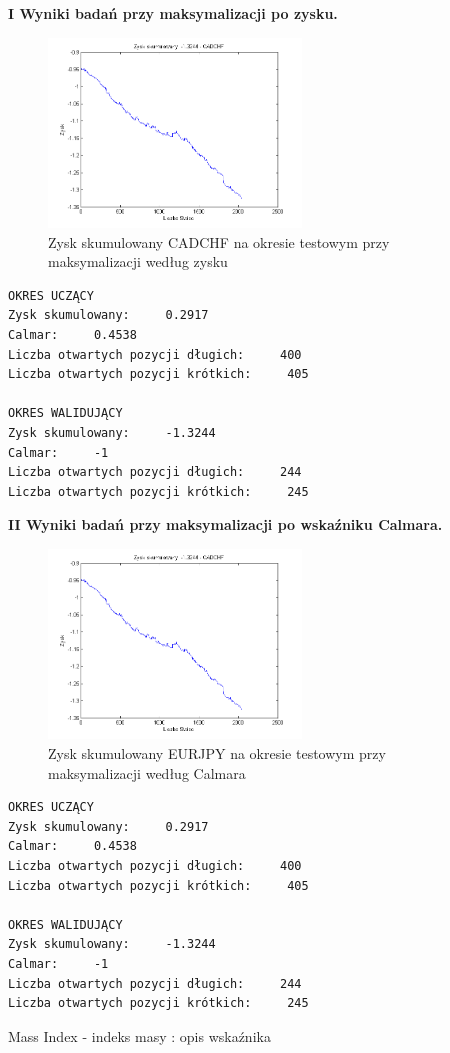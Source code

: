 \documentclass[12pt,a4paper]{article}
\begin{document}
\noindent \textbf{I Wyniki badań przy maksymalizacji po zysku.}\\
\begin{figure}[h!]
\centering
\includegraphics[width = 0.6\textwidth]{SS_CADCHF_S4LS_zysk.png}
\caption{Zysk skumulowany CADCHF na okresie testowym przy maksymalizacji według zysku}
\end{figure}
\FloatBarrier
\begin{verbatim}
OKRES UCZĄCY
Zysk skumulowany:     0.2917
Calmar:     0.4538
Liczba otwartych pozycji długich:     400
Liczba otwartych pozycji krótkich:     405

OKRES WALIDUJĄCY
Zysk skumulowany:     -1.3244
Calmar:     -1
Liczba otwartych pozycji długich:     244
Liczba otwartych pozycji krótkich:     245
\end{verbatim}
\newpage
\textbf{II Wyniki badań przy maksymalizacji po wskaźniku Calmara.}\\
\begin{figure}[h!]
\centering
\includegraphics[width = 0.6\textwidth]{SS_CADCHF_S4LS_calmar.png}
\caption{Zysk skumulowany EURJPY na okresie testowym przy maksymalizacji według Calmara}
\end{figure}
\FloatBarrier
\begin{verbatim}
OKRES UCZĄCY
Zysk skumulowany:     0.2917
Calmar:     0.4538
Liczba otwartych pozycji długich:     400
Liczba otwartych pozycji krótkich:     405

OKRES WALIDUJĄCY
Zysk skumulowany:     -1.3244
Calmar:     -1
Liczba otwartych pozycji długich:     244
Liczba otwartych pozycji krótkich:     245
\end{verbatim}
\newpage
\begin{center}
\begin{large}
Mass Index - indeks masy : opis wskaźnika\\
\end{large}
\end{center}
\end{document}
